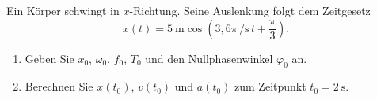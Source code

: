 \begin{ExerciseBlock}
Ein Körper schwingt in $x$-Richtung. Seine Auslenkung folgt dem Zeitgesetz
\[
 x(t)=\qty{5}{\metre}\cos\left(3{,}6\pi\,\unit{\per\second}\,t+\frac{\pi}{3}\right).
\]
\begin{enumerate}
\item Geben Sie $x_0$, $\omega_0$, $f_0$, $T_0$ und den Nullphasenwinkel $\varphi_0$ an.
\item Berechnen Sie $x(t_0)$, $v(t_0)$ und $a(t_0)$ zum Zeitpunkt $t_0=\qty{2}{\second}$.
\end{enumerate}
\end{ExerciseBlock}
